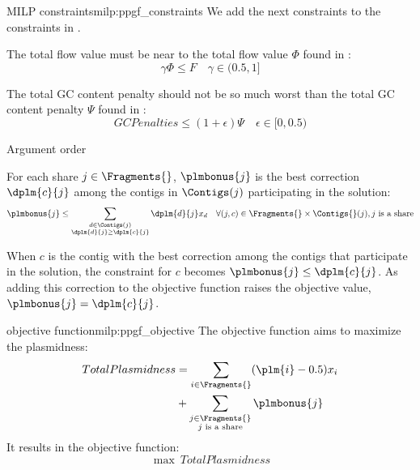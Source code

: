 \begin{definition}{\PPGF{} MILP constraints}{milp:ppgf_constraints}
    We add the next constraints to the constraints in .

    The total flow value must be near to the total flow value \(\Phi\) found in \MCF{}:
    \begin{equation}
        \gamma \Phi \leq  F \quad \gamma \in (0.5, 1]
    \end{equation}

    The total GC content penalty should not be so much worst than the total GC content penalty \(\Psi\) found in \MCF{}:
    \begin{equation}
       GCPenalties \leq (1 + \epsilon) \Psi \quad \epsilon \in [0, 0.5)
    \end{equation}

    \begin{refactorbox}
        \begin{fixmebox}
            Argument order
        \end{fixmebox}
        For each share \(j \in \Fragments{}\), \(\plmbonus{j}\) is the best correction \(\dplm{c}{j}\) among the contigs in \(\Contigs(j)\) participating in the solution:
        \begin{equation}
          \plmbonus{j} \leq \sum_{\substack{ d \in \Contigs(j) \\ \dplm{d}{j} \geq \dplm{c}{j} }} \dplm{d}{j} x_d \quad \forall (j, c) \in \Fragments{}\times\Contigs{}(j), j \text{ is a share}
        \end{equation}
    
        \begin{notebox}
          When \(c\) is the contig with the best correction among the contigs that participate in the solution, the constraint for \(c\) becomes \(\plmbonus{j} \leq \dplm{c}{j}\). As adding this correction to the objective function raises the objective value, \(\plmbonus{j} = \dplm{c}{j}\).
        \end{notebox}
    \end{refactorbox}
\end{definition}


\begin{definition}{\PPGF{} objective function}{milp:ppgf_objective}
    The objective function aims to maximize the plasmidness:
        \begin{equation}
        \begin{split}
            TotalPlasmidness & = \sum_{i \in \Fragments{}} (\plm{i} - 0.5) x_i \\
            & + \sum_{\substack{ j \in \Fragments{} \\ j \text{ is a share} }} \plmbonus{j}
        \end{split}
        \end{equation}
    It results in the objective function:
    \begin{equation}
        \max ~ TotalPlasmidness
    \end{equation}
\end{definition}
